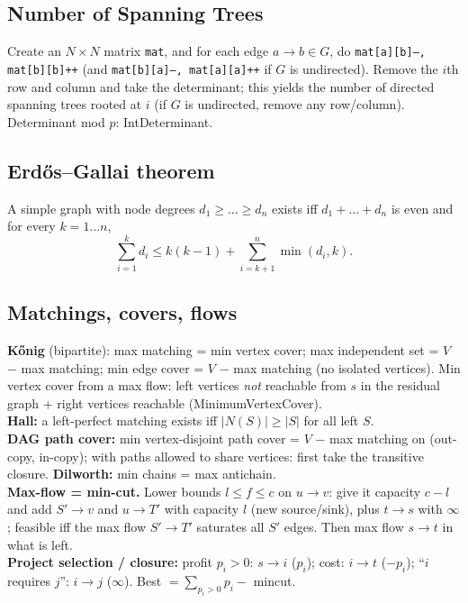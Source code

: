 	\subsection{Number of Spanning Trees}
		Create an $N\times N$ matrix \texttt{mat}, and for each edge $a \rightarrow b \in G$, do
		\texttt{mat[a][b]--, mat[b][b]++} (and \texttt{mat[b][a]--, mat[a][a]++} if $G$ is undirected).
		Remove the $i$th row and column and take the determinant; this yields the number of directed spanning trees rooted at $i$
		(if $G$ is undirected, remove any row/column). Determinant mod $p$: IntDeterminant.

	\subsection{Erdős–Gallai theorem}
		A simple graph with node degrees $d_1 \ge \dots \ge d_n$ exists iff $d_1 + \dots + d_n$ is even and for every $k = 1\dots n$,
		\[ \sum _{i=1}^{k}d_{i}\leq k(k-1)+\sum _{i=k+1}^{n}\min(d_{i},k). \]

	\subsection{Matchings, covers, flows}
		\label{sec:konig}
		\textbf{K\H{o}nig} (bipartite): max matching = min vertex cover;
		max independent set = $V$ $-$ max matching; min edge cover = $V$ $-$ max matching
		(no isolated vertices). Min vertex cover from a max flow: left vertices \emph{not} reachable
		from $s$ in the residual graph + right vertices reachable (MinimumVertexCover).\\
		\textbf{Hall:} a left-perfect matching exists iff $|N(S)| \ge |S|$ for all left $S$.\\
		\textbf{DAG path cover:} min vertex-disjoint path cover = $V$ $-$ max matching on (out-copy, in-copy);
		with paths allowed to share vertices: first take the transitive closure.
		\textbf{Dilworth:} min chains = max antichain.\\
		\textbf{Max-flow = min-cut.} Lower bounds $l \le f \le c$ on $u \to v$: give it capacity $c - l$ and
		add $S' \to v$ and $u \to T'$ with capacity $l$ (new source/sink), plus $t \to s$ with $\infty$;
		feasible iff the max flow $S' \to T'$ saturates all $S'$ edges. Then max flow $s \to t$ in what is left.\\
		\textbf{Project selection / closure:} profit $p_i > 0$: $s \to i$ ($p_i$); cost: $i \to t$ ($-p_i$);
		``$i$ requires $j$'': $i \to j$ ($\infty$). Best $= \sum_{p_i > 0} p_i -$ mincut.
